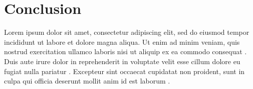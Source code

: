 \chapter{Conclusion}

Lorem ipsum dolor sit amet, consectetur adipiscing elit, sed do eiusmod tempor incididunt ut labore et dolore magna aliqua. Ut enim ad minim veniam, quis nostrud exercitation ullamco laboris nisi ut aliquip ex ea commodo consequat \cite{ref1}. Duis aute irure dolor in reprehenderit in voluptate velit esse cillum dolore eu fugiat nulla pariatur \cite{ref2}. Excepteur sint occaecat cupidatat non proident, sunt in culpa qui officia deserunt mollit anim id est laborum \cite{ref3}.
